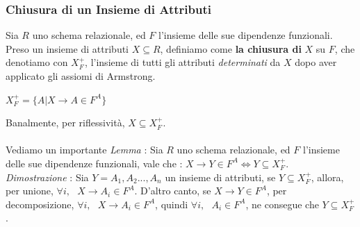 \documentclass[12pt, letterpaper]{article}
\begin{document}
\subsubsection{Chiusura di un Insieme di Attributi}\label{Xclosure}
Sia \(R\) uno schema relazionale, ed \(F\) l'insieme delle sue dipendenze funzionali. Preso un 
insieme di attributi \(X\subseteq R\), definiamo come \textbf{la chiusura di }\(X\) su \(F\), che denotiamo 
con \(X^+_F\), l'insieme di tutti gli attributi \textit{determinati} da \(X\) dopo aver applicato 
gli assiomi di Armstrong.\begin{center}
    \(X^+_F = \{A|X\rightarrow A \in F^A\}\)
\end{center}
Banalmente, per riflessività, \(X\subseteq X^+_F\).
\\\hphantom{}\\Vediamo un importante \textit{Lemma} : Sia \(R\) uno schema relazionale, ed \(F\) l'insieme delle sue dipendenze funzionali, 
vale che : \(X\rightarrow Y \in F^A \iff Y\subseteq X_F^+\). \\
\textit{Dimostrazione }: Sia \(Y=A_1,A_2...,A_n\) un insieme di attributi, se \(Y\subseteq X^+_F\), allora, 
per unione, \(\forall i, \text{ }X\rightarrow A_i\in F^A\). D'altro canto, se \(X\rightarrow Y \in F^A\), 
per decomposizione, \(\forall i, \text{ }X\rightarrow A_i\in F^A\), quindi \(\forall i, \text{ }A_i\in F^A\), 
ne consegue che \(Y\subseteq X_F^+\).
\end{document}
